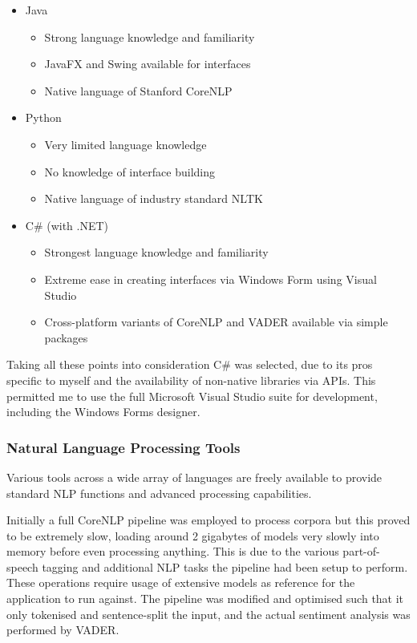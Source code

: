 \documentclass{article}
\begin{document}
{        \begin{itemize}
            \item Java
            \begin{itemize}
                \item Strong language knowledge and familiarity
                \item JavaFX and Swing available for interfaces
                \item Native language of Stanford CoreNLP
            \end{itemize}
            \item Python
            \begin{itemize}
                \item Very limited language knowledge
                \item No knowledge of interface building
                \item Native language of industry standard NLTK
            \end{itemize}
            \item C\# (with .NET)
            \begin{itemize}
                \item Strongest language knowledge and familiarity
                \item Extreme ease in creating interfaces via Windows Form using Visual Studio
                \item Cross-platform variants of CoreNLP and VADER available via simple packages
            \end{itemize}
        \end{itemize}
        Taking all these points into consideration C\# was selected, due to its pros specific to myself and the availability of non-native libraries via APIs. This permitted me to use the full Microsoft Visual Studio suite for development, including the Windows Forms designer.
        \subsubsection{Natural Language Processing Tools}
        \label{subsec:nlpTools}
        Various tools across a wide array of languages are freely available to provide standard NLP functions and advanced processing capabilities.

        Initially a full CoreNLP pipeline was employed to process corpora but this proved to be extremely slow, loading around 2 gigabytes of models very slowly into memory before even processing anything. This is due to the various part-of-speech tagging and additional NLP tasks the pipeline had been setup to perform. These operations require usage of extensive models as reference for the application to run against. The pipeline was modified and optimised such that it only tokenised and sentence-split the input, and the actual sentiment analysis was performed by VADER.

}
\end{document}
